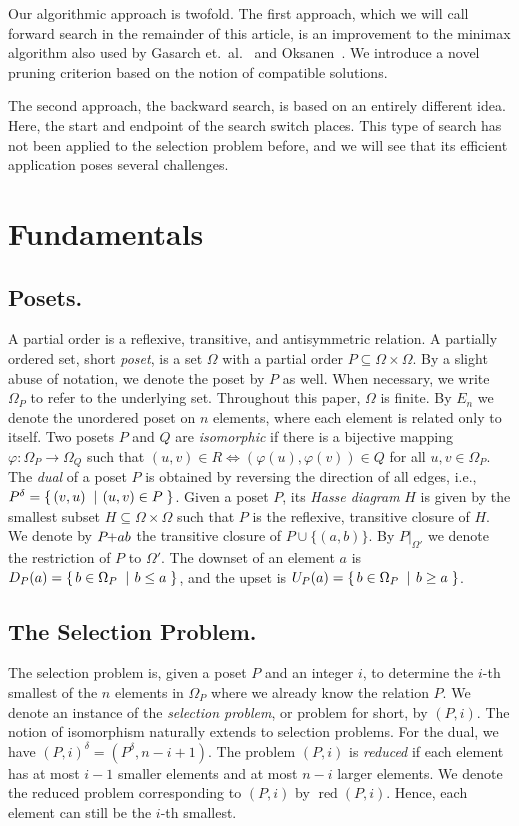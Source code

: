 \documentclass[a4paper,UKenglish,cleveref, autoref, thm-restate]{lipics-v2021}
\makeatletter
\newcommand{\set}[2]{\left\{\, \mathinner{#1}\vphantom{#2}\: \left|\: \vphantom{#1}\mathinner{#2} \right.\,\right\}}
\newcommand\ie{i.e\@., }
\newcommand{\sse}{\subseteq}
\newcommand{\pchild}[3]{{#1}\kern-1pt{+}{#2}{#3}}
\newcommand{\dual}[1]{{#1}^{\delta}}
\newcommand{\reduced}[1]{\operatorname{red}{#1}}
\newcommand{\less}[2]{D_{#1}(#2)}
\newcommand{\greater}[2]{U_{#1}(#2)}
\makeatother
\begin{document}
Our algorithmic approach is twofold.
The first approach, which we will call forward search in the remainder of this article, is an improvement to the minimax algorithm also used by Gasarch et.\ al\@.~\cite{Gasarch1996} and Oksanen~\cite{Oksanen,Oksanen2006}.
We introduce a novel pruning criterion based on the notion of compatible solutions.

The second approach, the backward search, is based on an entirely different idea.
Here, the start and endpoint of the search switch places.
This type of search has not been applied to the selection problem before, and we will see that its efficient application poses several challenges.

\section{Fundamentals}

\subsection{Posets.}
A partial order is a reflexive, transitive, and antisymmetric relation.
A partially ordered set, short \emph{poset}, is a set $\Omega$ with a partial order $P \subseteq \Omega \times \Omega$.
By a slight abuse of notation, we denote the poset by $P$ as well.
When necessary, we write $\Omega_P$ to refer to the underlying set.
Throughout this paper, $\Omega$ is finite.
By $E_n$ we denote the unordered poset on $n$ elements, where each element is related only to itself.
Two posets $P$ and $Q$ are \emph{isomorphic} if there is a bijective mapping $\varphi: \Omega_P \to \Omega_Q$ such that $(u, v) \in R \iff (\varphi(u), \varphi(v)) \in Q$ for all $u, v \in \Omega_P$.
The \emph{dual} of a poset $P$ is obtained by reversing the direction of all edges, \ie $\dual{P} = \set{(v,u)}{(u,v) \in P}$.
Given a poset $P$, its \emph{Hasse diagram} $H$ is given by the smallest subset $H \sse \Omega \times \Omega$ such that $P$ is the reflexive, transitive closure of $H$.
We denote by $\pchild{P}{a}{b}$ the transitive closure of $P \cup \{(a, b)\}$.
By $P|_{\Omega'}$ we denote the restriction of $P$ to $\Omega'$.
The downset of an element $a$ is $\less{P}{a} = \set{b \in \Omega_P}{b \le a}$, and the upset is $\greater{P}{a} = \set{b \in \Omega_P}{b \ge a}$.

\subsection{The Selection Problem.}
The selection problem is, given a poset $P$ and an integer $i$, to determine the $i$-th smallest of the $n$ elements in $\Omega_P$ where we already know the relation $P$.
We denote an instance of the \emph{selection problem}, or problem for short, by $(P, i)$.
The notion of isomorphism naturally extends to selection problems.
For the dual, we have $\dual{(P, i)} = (\dual{P}, n - i + 1)$.
The problem $(P, i)$ is \emph{reduced} if each element has at most $i - 1$ smaller elements and at most $n - i$ larger elements.
We denote the reduced problem corresponding to $(P, i)$ by $\reduced{(P, i)}$.
Hence, each element can still be the $i$-th smallest.
\end{document}

